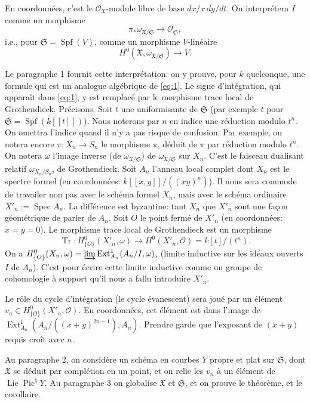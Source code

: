 \documentclass[12pt,a4paper]{article}
\theoremstyle{plain}
\theoremstyle{definition}
\theoremstyle{remark}
\DeclareMathOperator{\Spf}{Spf}
\DeclareMathOperator{\Spec}{Spec}
\DeclareMathOperator{\Ext}{Ext}
\DeclareMathOperator{\Lie}{Lie}
\DeclareMathOperator{\Pic}{Pic}
\DeclareMathOperator{\Tr}{Tr}
\newcommand{\OO}{\mathcal{O}}
\providecommand{\Ext}{\operatorname{Ext}}
\providecommand{\Spec}{\operatorname{Spec}}
\providecommand{\Lie}{\operatorname{Lie}}
\providecommand{\Tr}{\operatorname{Tr}}
\begin{document}
En coordonnées, c'est le $\OO_{\mathfrak{X}}$-module libre de base
$dx/x\,dy/dt$. On interprétera $I$ comme un morphisme
\[
\pi_*\omega_{\mathfrak{X}/\mathfrak{S}}\to\OO_{\mathfrak{S}},
\]
i.e., pour $\mathfrak{S}=\Spf(V)$, comme un morphisme $V$-linéaire
\[
H^0(\mathfrak{X},\omega_{\mathfrak{X}/\mathfrak{S}})\to V.
\]

Le paragraphe 1 fournit cette interprétation: on y prouve, pour $k$ quelconque,
une formule qui est un analogue algébrique de \eqref{eq:1}. Le signe d'intégration,
qui apparaît dans \eqref{eq:1}, y est remplacé par le morphisme trace local de
Grothendieck. Précisons. Soit $t$ une uniformisante de $\mathfrak{S}$ (par exemple $t$
pour $\mathfrak{S}=\Spf(k[[t]])$). Nous noterons par $n$ en indice une réduction modulo
$t^n$. On omettra l'indice quand il n'y a pas risque de confusion. Par exemple, on
notera encore $\pi:X_n\to S_n$ le morphisme $\pi$, déduit de $\pi$ par réduction modulo
$t^n$. On notera $\omega$ l'image inverse (de $\omega_{\mathfrak{X}/\mathfrak{S}}$) de
$\omega_{\mathfrak{X}/\mathfrak{S}}$ sur $X_n$. C'est le faisceau dualisant relatif
$\omega_{X_n/S_n}$, de Grothendieck. Soit $A_n$ l'anneau local complet dont $X_n$ est
le spectre formel (en coordonnées: $k[[x,y]]/((xy)^n)$). Il nous sera commode de
travailer non pas avec le schéma formel $X_n$, mais avec le schéma ordinaire
$X'_n:=\Spec A_n$. La différence est byzantine: tant $X_n$ que $X'_n$ sont une façon
géométrique de parler de $A_n$. Soit $O$ le point fermé de $X'_n$ (en coordonnées:
$x=y=0$). Le morphisme trace local de Grothendieck est un morphisme
\[
\Tr:H^0_{\{O\}}(X'_n,\omega)\to H^0(X'_n,\OO)=k[t]/(t^n).
\]
On a $H^0_{\{O\}}(X_n,\omega)=\varinjlim\Ext^1_{A_n}(A_n/I,\omega)$, (limite inductive sur les
idéaux ouverts $I$ de $A_n$). C'est pour écrire cette limite inductive comme un groupe de
cohomologie à support qu'il nous a fallu introduire $X'_n$.

Le rôle du cycle d'intégration (le cycle évanescent) sera joué par un élément
$v_n\in H^0_{\{O\}}(X'_n,\OO)$. En coordonnées, cet élément est dans l'image de
$\Ext^1_{A_n}(A_n/((x+y)^{2n-1}),A_n)$. Prendre garde que l'exposant de $(x+y)$ requis croît
avec $n$.

Au paragraphe 2, on considère un schéma en courbes $Y$ propre et plat sur
$\mathfrak{S}$, dont $\mathfrak{X}$ se déduit par complétion en un point, et on relie les
$v_n$ à un élément de $\Lie\Pic^\natural Y$. Au paragraphe 3 on globalise
$\mathfrak{X}$ et $\mathfrak{S}$, et on prouve le théorème, et le corollaire.
\end{document}
